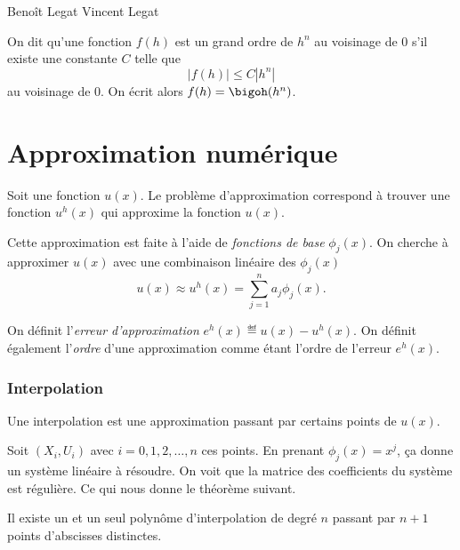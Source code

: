 

\newcommand\fv[1]{{\bf #1}} %

\usepackage{listings}
\usepackage{numprint}
\DeclareMathOperator{\dist}{dist}

{Beno\^it Legat}
{Vincent Legat}


\begin{mydef}
  On dit qu'une fonction $f(h)$ est un grand ordre de $h^n$ au voisinage
  de 0 s'il existe une constante $C$ telle que
  \[ |f(h)| \leq C |h^n| \]
  au voisinage de 0.
  On écrit alors $f(h) = \bigoh(h^n)$.
\end{mydef}

\part{Approximation numérique}
Soit une fonction $u(x)$.
Le problème d'approximation correspond à trouver une fonction
$u^h(x)$ qui approxime la fonction $u(x)$.

Cette approximation est faite à l'aide de \emph{fonctions de base} $\phi_j(x)$.
On cherche à approximer $u(x)$ avec une combinaison linéaire des $\phi_j(x)$
\[ u(x) \approx u^h(x) = \sum_{j=1}^n a_j \phi_j(x). \]

On définit l'\emph{erreur d'approximation} $e^h(x) \eqdef u(x) - u^h(x)$.
On définit également l'\emph{ordre} d'une approximation comme étant l'ordre de
l'erreur $e^h(x)$.

\section{Interpolation}
Une interpolation est une approximation passant par certains points de $u(x)$.

Soit $(X_i, U_i)$ avec $i = 0, 1, 2, \ldots, n$ ces points.
En prenant $\phi_j(x) = x^j$, ça donne un système linéaire à résoudre.
On voit que la matrice des coefficients du système est régulière.
Ce qui nous donne le théorème suivant.
\begin{mytheo}
  Il existe un et un seul polynôme d'interpolation de degré $n$ passant
  par $n+1$ points d'abscisses distinctes.
\end{mytheo}

